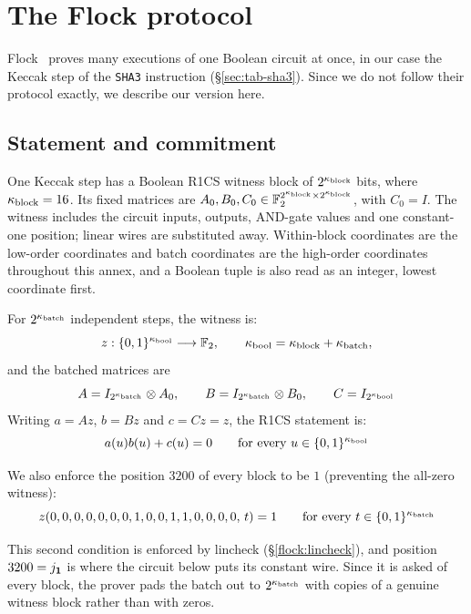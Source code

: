 \section{The Flock protocol}\label{annex:flock}

Flock~\cite{Flock26} proves many executions of one Boolean circuit at once, in our case the Keccak step of the \texttt{SHA3} instruction (\S\ref{sec:tab-sha3}). Since we do not follow their protocol exactly, we describe our version here.

\subsection{Statement and commitment}\label{flock:statement}

One Keccak step has a Boolean R1CS witness block of $2^{\kappa_{\mathrm{block}}}$ bits, where $\kappa_{\mathrm{block}}=16$. Its fixed matrices are $A_0,B_0,C_0\in\mathbb{F}_2^{2^{\kappa_{\mathrm{block}}}\times 2^{\kappa_{\mathrm{block}}}}$, with $C_0=I$. The witness includes the circuit inputs, outputs, AND-gate values and one constant-one position; linear wires are substituted away. Within-block coordinates are the low-order coordinates and batch coordinates are the high-order coordinates throughout this annex, and a Boolean tuple is also read as an integer, lowest coordinate first.

For $2^{\kappa_{\mathrm{batch}}}$ independent steps, the witness is:
\[
z:\{0,1\}^{\kappa_{\mathrm{bool}}}\longrightarrow\mathbb{F}_2,\qquad \kappa_{\mathrm{bool}}=\kappa_{\mathrm{block}}+\kappa_{\mathrm{batch}},
\]
and the batched matrices are
\[
A=I_{2^{\kappa_{\mathrm{batch}}}}\otimes A_0,\qquad B=I_{2^{\kappa_{\mathrm{batch}}}}\otimes B_0,\qquad C=I_{2^{\kappa_{\mathrm{bool}}}}
\]
Writing $a=Az$, $b=Bz$ and $c=Cz=z$, the R1CS statement is:
\begin{equation}\label{flock:eq:r1cs}
a(u)b(u)+c(u)=0\qquad\text{for every }u\in\{0,1\}^{\kappa_{\mathrm{bool}}}
\end{equation}

We also enforce the position $3200$ of every block to be $1$ (preventing the all-zero witness):
\begin{equation}\label{flock:eq:const-one}
z(0,0,0,0,0,0,0,1,0,0,1,1,0,0,0,0,\,t)=1\qquad\text{for every }t\in\{0,1\}^{\kappa_{\mathrm{batch}}}
\end{equation}

This second condition is enforced by lincheck (\S\ref{flock:lincheck}), and position $3200=j_{\mathbf{1}}$ is where the circuit below puts its constant wire. Since it is asked of every block, the prover pads the batch out to $2^{\kappa_{\mathrm{batch}}}$ with copies of a genuine witness block rather than with zeros.

